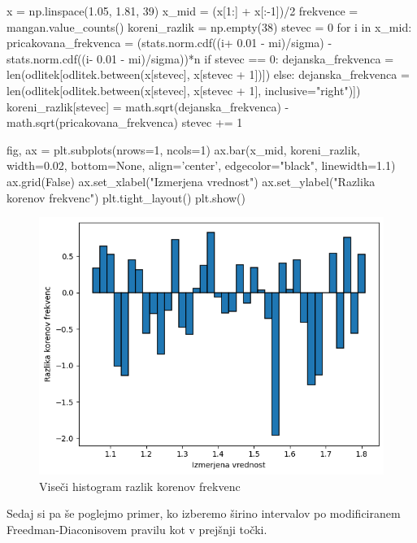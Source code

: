 \documentclass[10pt, a4paper]{article}
\begin{document}
\begin{python}
    x = np.linspace(1.05, 1.81, 39)
    x_mid = (x[1:] + x[:-1])/2
    frekvence = mangan.value_counts()
    koreni_razlik = np.empty(38)
    stevec = 0
    for i in x_mid:
        pricakovana_frekvenca = (stats.norm.cdf((i+ 0.01 - mi)/sigma) - stats.norm.cdf((i- 0.01 - mi)/sigma))*n
        if stevec == 0:
            dejanska_frekvenca = len(odlitek[odlitek.between(x[stevec], x[stevec + 1])])
        else:
            dejanska_frekvenca = len(odlitek[odlitek.between(x[stevec], x[stevec + 1], inclusive="right")])
        koreni_razlik[stevec] = math.sqrt(dejanska_frekvenca) - math.sqrt(pricakovana_frekvenca)
        stevec += 1

    fig, ax = plt.subplots(nrows=1, ncols=1)
    ax.bar(x_mid, koreni_razlik, width=0.02, bottom=None, align='center', edgecolor="black", linewidth=1.1)
    ax.grid(False)
    ax.set_xlabel("Izmerjena vrednost")
    ax.set_ylabel("Razlika korenov frekvenc")
    plt.tight_layout()
    plt.show()
\end{python}

\begin{figure}[H]
    \centering
    \includegraphics[scale=0.75]{Images/2bi.png}
    \caption{Viseči histogram razlik korenov frekvenc}
\end{figure}

Sedaj si pa še poglejmo primer, ko izberemo širino intervalov po modificiranem
Freedman-Diaconisovem pravilu kot v prejšnji točki.
\end{document}

